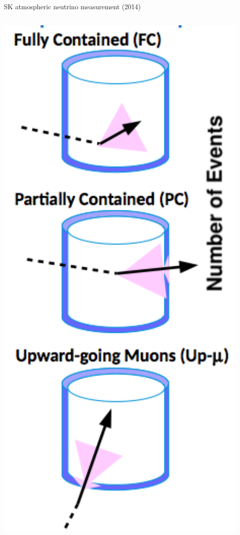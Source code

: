 \begin{frame}[t]{SK atmospheric neutrino measurement (2014)}

\begin{columns}
  \begin{column}{0.30\textwidth}
    \includegraphics[width=0.95\textwidth]{./images/3nu/atmo/sk_event_categories.png}

\end{column}
\end{columns}
\end{frame}
